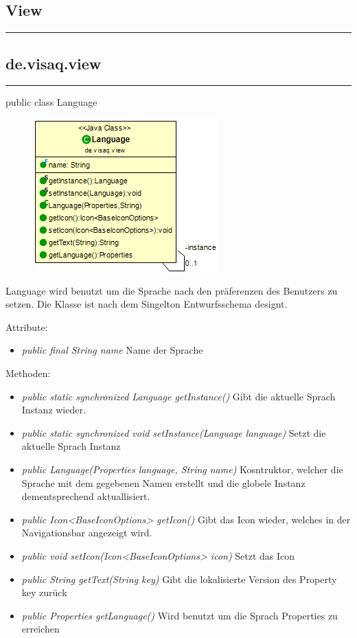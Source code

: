 \subsection{View}

\rule{\textwidth}{0.4pt} 
\subsection{de.visaq.view}

\rule{\textwidth}{0.4pt} 
public class Language

\begin{minipage}{0.3\textwidth}
    \begin{figure}[H]
        \includegraphics[scale = 0.5]{media/frontend/view/de.view/Language_Class.png}
    \end{figure}
    \end{minipage} \hfill
    \begin{minipage}{0.6\textwidth}
    Language wird benutzt um die Sprache nach den präferenzen des Benutzers zu setzen. Die Klasse ist nach dem Singelton Entwurfsschema designt.
    \end{minipage}

Attribute:
\begin{itemize} 
    \item \emph{public final String name} Name der Sprache
\end{itemize}
Methoden:
\begin{itemize} 
    \item \emph{public static synchronized Language getInstance()} Gibt die aktuelle Sprach Instanz wieder.
    \item \emph{public static synchronized void setInstance(Language language)} Setzt die aktuelle Sprach Instanz
    \item \emph{public Language(Properties language, String name)} Kosntruktor, welcher die Sprache mit dem gegebenen Namen erstellt und die globele Instanz dementsprechend aktuallisiert.
    \item \emph{public Icon<BaseIconOptions> getIcon()} Gibt das Icon wieder, welches in der Navigationsbar angezeigt wird.
    \item \emph{public void setIcon(Icon<BaseIconOptions> icon)} Setzt das Icon
    \item \emph{public String getText(String key)} Gibt die lokalisierte Version des Property key zurück
    \item \emph{public Properties getLanguage()} Wird benutzt um die Sprach Properties zu erreichen
\end{itemize}

